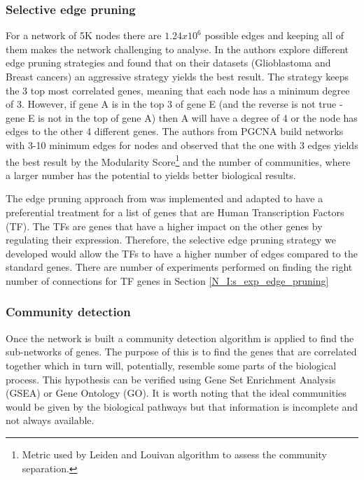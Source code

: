 \subsubsection{Selective edge pruning}
For a network of 5K nodes there are $1.24x10^6$ possible edges and keeping all of them makes the network challenging to analyse. In \citet{Care2019-ij} the authors explore different edge pruning strategies and found that on their datasets (Glioblastoma and Breast cancers) an aggressive strategy yields the best result. The strategy keeps the 3 top most correlated genes, meaning that each node has a minimum degree of 3. However, if gene A is in the top 3 of gene E (and the reverse is not true - gene E is not in the top of gene A) then A will have a degree of 4 or the node has edges to the other 4 different genes. The authors from PGCNA build networks with 3-10 minimum edges for nodes and observed that the one with 3 edges yields the best result by the Modularity Score\footnote{Metric used by Leiden and Louivan algorithm to assess the community separation.} and the number of communities, where a larger number has the potential to yields better biological results.

The edge pruning approach from \citet{Care2019-ij} was implemented and adapted to have a preferential treatment for a list of genes that are Human Transcription Factors \cite{Lambert2018-el} (TF). The TFs are genes that have a higher impact on the other genes by regulating their expression. Therefore, the selective edge pruning strategy we developed would allow the TFs to have a higher number of edges compared to the standard genes. There are number of experiments performed on finding the right number of connections for TF genes in Section \ref{N_I:s_exp_edge_pruning}

\subsubsection{Community detection}

Once the network is built a community detection algorithm is applied to find the sub-networks of genes. The purpose of this is to find the genes that are correlated together which in turn will, potentially, resemble some parts of the biological process. This hypothesis can be verified using Gene Set Enrichment Analysis (GSEA) or Gene Ontology (GO). It is worth noting that the ideal communities would be given by the biological pathways but that information is incomplete and not always available.


